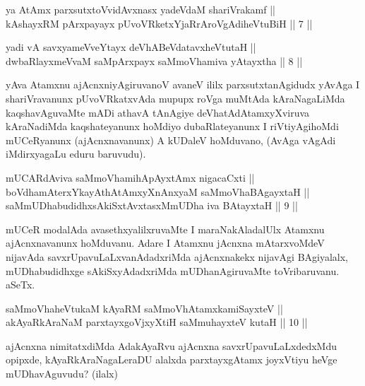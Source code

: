 \begin{shl}
ya AtAmx parxsutxtoV\s vidAvxnasx yadeVdaM shariVrakamf || \\
kAshayxRM pArxpayayx pUvoVRketxYjaRrAroVgAdiheVtuBiH \hfill || 7 ||
  
\end{shl}

\begin{shl}
yadi vA savxyameVveYtayx deVhABeVdatavxheVtutaH || \\
dwbaRlayxmeVvaM saMpArxpayx saMmoVhamiva yAtayxtha \hfill || 8 ||
  
\end{shl}

\begin{artha}
yAva Atamxnu ajAcnxniyAgiruvanoV avaneV ililx parxsutxtanAgidudx yAvAga
I shariVravanunx pUvoVRkatxvAda mupupx roVga muMtAda kAraNagaLiMda
kaqshavAguvaMte mADi athavA tAnAgiye deVhatAdAtamxyXviruva kAraNadiMda
kaqshateyanunx hoMdiyo dubaRlateyanunx I riVtiyAgihoMdi mUCeRyanunx
(ajAcnxnavanunx) A kUDaleV hoMduvano,  (AvAga vAgAdi iMdirxyagaLu eduru
baruvudu).
\end{artha}

\begin{shl}
mUCARdAviva saMmoVhamihApAyxtAmx nigacaCxti || \\
boVdhamAterxYkayAthAtAmxyXnAnxyaM saMmoVhaBAgayxtaH ||  \\
saMmUDhabudidhxsAkiSxtAvxtasxMmUDha iva BAtayxtaH \hfill || 9 ||
  
\end{shl}

\begin{artha}
mUCeR modalAda avasethxyalilxruvaMte I maraNakAladalUlx Atamxnu
ajAcnxnavanunx hoMduvanu. Adare I Atamxnu jAcnxna mAtarxvoMdeV
nijavAda savxrUpavuLaLxvanAdadxriMda ajAcnxnakekx nijavAgi BAgiyalalx,
mUDhabudidhxge sAkiSxyAdadxriMda mUDhanAgiruvaMte toVribaruvanu. aSeTx.
\end{artha}


\begin{shl}
saMmoVhaheVtukaM kAyaRM saMmoVhAtamxkamiSayxteV ||  \\
akAyaRkAraNaM parxtayxgoVjxyXtiH saMmuhayxteV kutaH \hfill || 10 ||
  
\end{shl}

\begin{artha}
ajAcnxna nimitatxdiMda AdakAyaRvu ajAcnxna savxrUpavuLaLxdedxMdu
opipxde, kAyaRkAraNagaLeraDU alalxda parxtayxgAtamx joyxVtiyu heVge
mUDhavAguvudu? (ilalx)
\end{artha}

